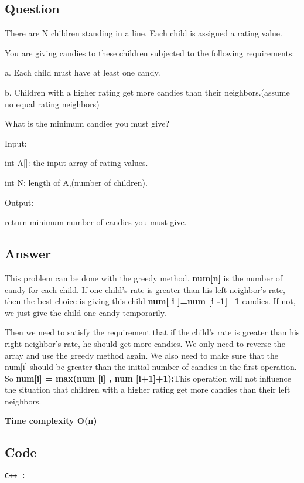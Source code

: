 \subsection{Question}

There are N children standing in a line. Each child is assigned a rating value.

You are giving candies to these children subjected to the following requirements:

a. Each child must have at least one candy.

b. Children with a higher rating get more candies than their neighbors.(assume no equal rating neighbors)

What is the minimum candies you must give?

Input:

int A[]: the input array of rating values.

int N: length of A,(number of children).

Output:

return minimum number of candies you must give.
\subsection{Answer}
This problem can be done with the greedy method. \textbf{num[n]} is the number of candy for each child. If one child's rate is greater than his left neighbor’s rate, then the best choice is giving this child \textbf{num[ i ]=num [i -1]+1} candies. If not, we just give the child one candy temporarily.

Then we need to satisfy the requirement that if the child's rate is greater than his right neighbor's rate, he should get more candies. We only need to reverse the array and use the greedy method again.  We also need to make sure that the num[i] should be greater than the initial number of candies in the first operation. So 
\textbf{num[i] = max(num [i] , num [i+1]+1);}This operation will not influence the situation that children with a higher rating get more candies than their left neighbors.

\textbf{\color{red}Time complexity O(n)}

\subsection{Code}
\texttt{C++ :}
